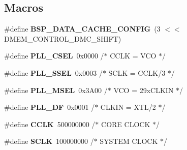 \subsection*{Macros}
\begin{DoxyCompactItemize}
\item 
\mbox{\label{group__RTEMSBSPsBfinBF537Stamp_gafb0b9fb8baf2e823fb177fe60e952669}} 
\#define {\bfseries B\+S\+P\+\_\+\+D\+A\+T\+A\+\_\+\+C\+A\+C\+H\+E\+\_\+\+C\+O\+N\+F\+IG}~(3 $<$$<$ D\+M\+E\+M\+\_\+\+C\+O\+N\+T\+R\+O\+L\+\_\+\+D\+M\+C\+\_\+\+S\+H\+I\+FT)
\item 
\mbox{\label{group__RTEMSBSPsBfinBF537Stamp_ga6d4afc313c110ee657fec3799e732cd5}} 
\#define {\bfseries P\+L\+L\+\_\+\+C\+S\+EL}~0x0000      /$\ast$ C\+C\+L\+K = V\+C\+O      $\ast$/
\item 
\mbox{\label{group__RTEMSBSPsBfinBF537Stamp_ga4dbfb2ccc698c17868f71a1c11cd18c1}} 
\#define {\bfseries P\+L\+L\+\_\+\+S\+S\+EL}~0x0003      /$\ast$ S\+C\+L\+K = C\+C\+L\+K/3   $\ast$/
\item 
\mbox{\label{group__RTEMSBSPsBfinBF537Stamp_ga55fc96ac6eb8602376d5ded88041c9d3}} 
\#define {\bfseries P\+L\+L\+\_\+\+M\+S\+EL}~0x3\+A00      /$\ast$ V\+C\+O = 29x\+C\+L\+K\+I\+N  $\ast$/
\item 
\mbox{\label{group__RTEMSBSPsBfinBF537Stamp_ga9a2b8a9935c8e1f75344a7041c2f1566}} 
\#define {\bfseries P\+L\+L\+\_\+\+DF}~0x0001      /$\ast$ C\+L\+K\+I\+N = X\+T\+L/2   $\ast$/
\item 
\mbox{\label{group__RTEMSBSPsBfinBF537Stamp_gaddec7d88e04ddfe6ac90caf602636c51}} 
\#define {\bfseries C\+C\+LK}~500000000   /$\ast$ C\+O\+RE C\+L\+O\+CK     $\ast$/
\item 
\mbox{\label{group__RTEMSBSPsBfinBF537Stamp_ga1b39f68c76d4942d903c0a16f1882728}} 
\#define {\bfseries S\+C\+LK}~100000000   /$\ast$ S\+Y\+S\+T\+EM C\+L\+O\+CK   $\ast$/
\item 
\mbox{\label{group__RTEMSBSPsBfinBF537Stamp_gadf4bdbd4f47009f392ab5e2defe56840}} 
$$
\end{DoxyCompactItemize}
